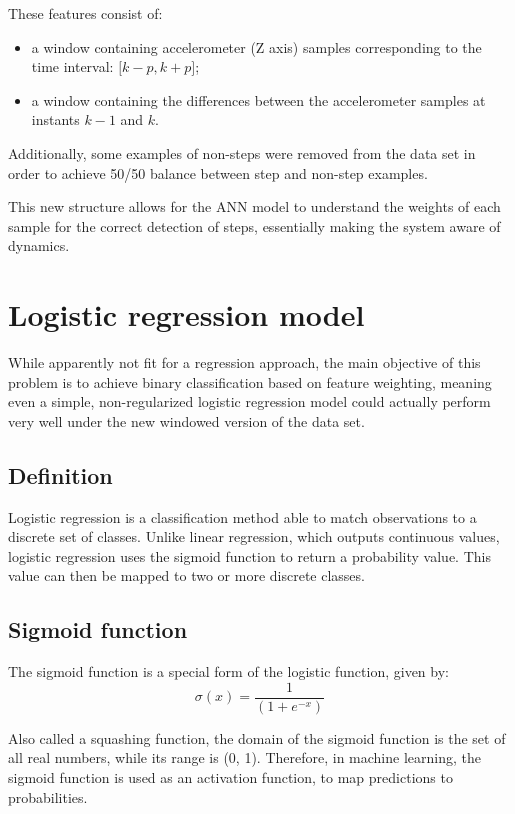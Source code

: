 \documentclass[conference]{IEEEtran}
\begin{document}
These features consist of: 
\begin{itemize}
    \item a window containing accelerometer (Z axis) samples corresponding to the time interval: ${[}k-p,k+p{]}$;
    \item a window containing the differences between the accelerometer samples at instants ${}k-1$ and $k$.
\end{itemize}

Additionally, some examples of non-steps were removed from the data set in order to achieve 50/50 balance between step and non-step examples. \par This new structure allows for the ANN model to understand the weights of each sample for the correct detection of steps, essentially making the system aware of dynamics.\par

\section{Logistic regression model}
While apparently not fit for a regression approach, the main objective of this problem is to achieve binary classification based on feature weighting, meaning even a simple, non-regularized logistic regression model could actually perform very well under the new windowed version of the data set.  \cite{b6} \par

\subsection{Definition}
Logistic regression is a classification method able to match observations to a discrete set of classes. Unlike linear regression, which outputs continuous values, logistic regression uses the sigmoid function to return a probability value. This value can then be mapped to two or more discrete classes.

\subsection{Sigmoid function}\label{SIGFUN}
The sigmoid function\cite{b2} is a special form of the logistic function, given by:
\begin{equation}
    \sigma(x) = \frac{1}{(1+e^{-x})}
    \label{eq1}
\end{equation}
\par Also called a squashing function, the domain of the sigmoid function is the set of all real numbers, while its range is (0, 1). Therefore, in machine learning, the sigmoid function is used as an activation function, to map predictions to probabilities.
\end{document}
